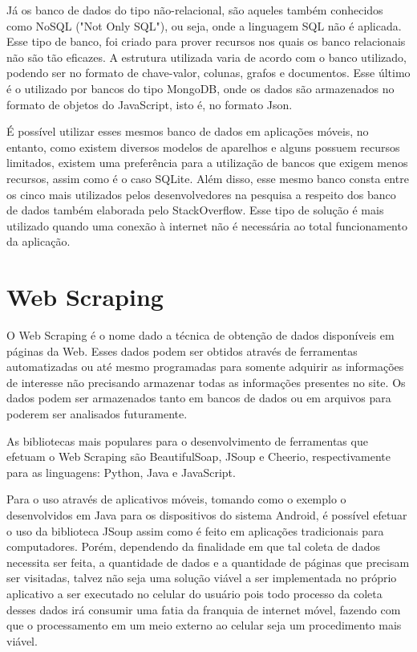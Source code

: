 Já os banco de dados do tipo não-relacional, são aqueles também conhecidos como NoSQL ("Not Only SQL"), ou seja, onde a linguagem SQL não é aplicada. Esse tipo de banco, foi criado para prover recursos nos quais os banco relacionais não são tão eficazes. A estrutura utilizada varia de acordo com o banco utilizado, podendo ser no formato de chave-valor, colunas, grafos e documentos. Esse último é o utilizado por bancos do tipo MongoDB, onde os dados são armazenados no formato de objetos do JavaScript, isto é, no formato Json.

É possível utilizar esses mesmos banco de dados em aplicações móveis, no entanto, como existem diversos modelos de aparelhos e alguns possuem recursos limitados, existem uma preferência para a utilização de bancos que exigem menos recursos, assim como é o caso SQLite. Além disso, esse mesmo banco consta entre os cinco mais utilizados pelos desenvolvedores na pesquisa a respeito dos banco de dados também elaborada pelo StackOverflow.\cite{stackOverflowRanking} Esse tipo de solução é mais utilizado quando uma conexão à internet não é necessária ao total funcionamento da aplicação.\cite{mobileDatabase}

\section{Web Scraping}

O Web Scraping\cite{webscrapingRockContent} é o nome dado a técnica de obtenção de dados disponíveis em páginas da Web. Esses dados podem ser obtidos através de ferramentas automatizadas ou até mesmo programadas para somente adquirir as informações de interesse não precisando armazenar todas as informações presentes no site.
Os dados podem ser armazenados tanto em bancos de dados ou em arquivos para poderem ser analisados futuramente.

As bibliotecas mais populares para o desenvolvimento de ferramentas que efetuam o Web Scraping são BeautifulSoap, JSoup e Cheerio, respectivamente para as linguagens: Python, Java e JavaScript.

Para o uso através de aplicativos móveis, tomando como o exemplo o desenvolvidos em Java para os dispositivos do sistema Android, é possível efetuar o uso da biblioteca JSoup assim como é feito em aplicações tradicionais para computadores. Porém, dependendo da finalidade em que tal coleta de dados necessita ser feita, a quantidade de dados e a quantidade de páginas que precisam ser visitadas, talvez não seja uma solução viável a ser implementada no próprio aplicativo a ser executado no celular do usuário pois todo processo da coleta desses dados irá consumir uma fatia da franquia de internet móvel, fazendo com que o processamento em um meio externo ao celular seja um procedimento mais viável.

